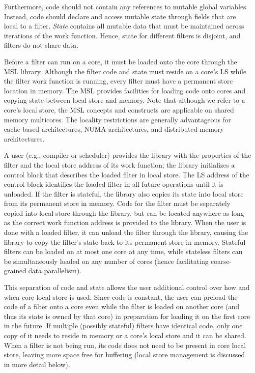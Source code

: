 Furthermore, code should not contain any references to mutable global
variables. Instead, code should declare and access mutable state
through fields that are local to a filter. \emph{State} contains all
mutable data that must be maintained across iterations of the work
function. Hence, state for different filters is disjoint, and filters
do not share data.

Before a filter can run on a core, it must be loaded onto the core
through the MSL library. Although the filter code and state must
reside on a core's LS while the filter work function is running, every
filter must have a permanent store location in memory. The MSL
provides facilities for loading code onto cores and copying state
between local store and memory. Note that although we refer to a
core's local store, the MSL concepts and constructs are applicable on
shared memory multicores. The locality restrictions are generally
advantageous for cache-based architectures, NUMA architectures, and
distributed memory architectures.

A user (e.g., compiler or scheduler) provides the library with the
properties of the filter and the local store address of its work
function; the library initializes a control block that describes the
loaded filter in local store. The LS address of the control block
identifies the loaded filter in all future operations until it is
unloaded. If the filter is stateful, the library also copies its state
into local store from its permanent store in memory. Code for the
filter must be separately copied into local store through the library,
but can be located anywhere as long as the correct work function
address is provided to the library. When the user is done with a
loaded filter, it can unload the filter through the library, causing
the library to copy the filter's state back to its permanent store in
memory. Stateful filters can be loaded on at most one core at any
time, while stateless filters can be simultaneously loaded on any
number of cores (hence facilitating coarse-grained data parallelism).

This separation of code and state allows the user additional control
over how and when core local store is used. Since code is constant,
the user can preload the code of a filter onto a core even while the
filter is loaded on another core (and thus its state is owned by that
core) in preparation for loading it on the first core in the
future. If multiple (possibly stateful) filters have identical code,
only one copy of it needs to reside in memory or a core's local store
and it can be shared. When a filter is not being run, its code does
not need to be present in core local store, leaving more space free
for buffering (local store management is discussed in more detail
below).

